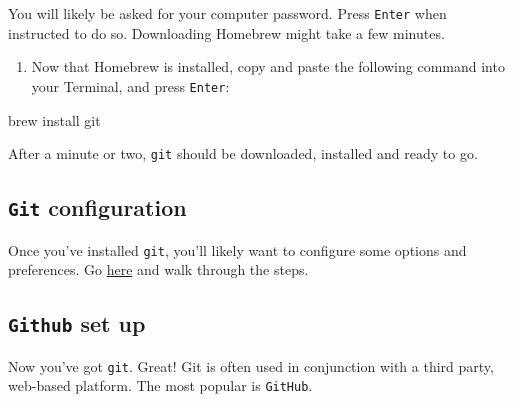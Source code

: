 \documentclass[]{book}
\newenvironment{Shaded}{\begin{snugshade}}{\end{snugshade}}
\newcommand{\NormalTok}[1]{#1}
\newcommand{\OperatorTok}[1]{\textcolor[rgb]{0.81,0.36,0.00}{\textbf{#1}}}
\newcommand{\StringTok}[1]{\textcolor[rgb]{0.31,0.60,0.02}{#1}}
\providecommand{\tightlist}{%
  \setlength{\itemsep}{0pt}\setlength{\parskip}{0pt}}
\begin{document}
\begin{Shaded}
\end{Shaded}

You will likely be asked for your computer password. Press \texttt{Enter} when instructed to do so. Downloading Homebrew might take a few minutes.

\begin{enumerate}
\def\labelenumi{\arabic{enumi}.}
\setcounter{enumi}{2}
\tightlist
\item
  Now that Homebrew is installed, copy and paste the following command into your Terminal, and press \texttt{Enter}:
\end{enumerate}

\begin{Shaded}
\begin{Highlighting}[]
\NormalTok{brew install git}
\end{Highlighting}
\end{Shaded}

After a minute or two, \texttt{git} should be downloaded, installed and ready to go.

\hypertarget{git-configuration}{%
\subsection*{\texorpdfstring{\texttt{Git} configuration}{Git configuration}}\label{git-configuration}}

Once you've installed \texttt{git}, you'll likely want to configure some options and preferences. Go \href{https://git-scm.com/book/en/v2/Getting-Started-First-Time-Git-Setup}{here} and walk through the steps.

\hypertarget{github-set-up}{%
\subsection*{\texorpdfstring{\texttt{Github} set up}{Github set up}}\label{github-set-up}}

Now you've got \texttt{git}. Great! Git is often used in conjunction with a third party, web-based platform. The most popular is \texttt{GitHub}.
\end{document}
